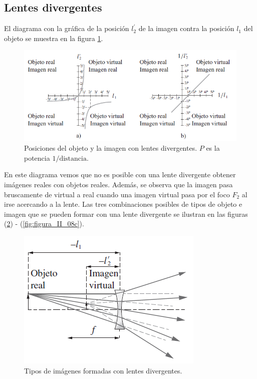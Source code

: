 \documentclass[14pt]{extarticle}
\begin{document}
\subsection{Lentes divergentes}

El diagrama con la gráfica de la posición $l_{2}^{\prime}$ de la imagen contra la posición $l_{1}$ del objeto se muestra en la figura \ref{fig:figura_II_07}.
\begin{figure}[H]
    \centering
    \includegraphics[scale=0.8]{Imagenes/Lentes_08.png}
    \caption{Posiciones del objeto y la imagen con lentes divergentes. $P$ es la potencia $1/\text{distancia}$.}
    \label{fig:figura_II_07}
\end{figure}
En este diagrama vemos que no es posible con una lente divergente obtener imágenes reales con objetos reales. Además, se observa que la imagen pasa bruscamente de virtual a real cuando una imagen virtual pasa por el foco $F_{2}$ al irse acercando a la lente. Las tres combinaciones posibles de tipos de objeto e imagen que se pueden formar con una lente divergente se ilustran en las figuras (\ref{fig:figura_II_08a}) - (\ref{fig:figura_II_08c}).
\begin{figure}[H]
    \centering
    \includegraphics[scale=0.8]{Imagenes/Lentes_09a.png}
    \caption{Tipos de imágenes formadas con lentes divergentes.}
    \label{fig:figura_II_08a}
\end{figure}
\end{document}
